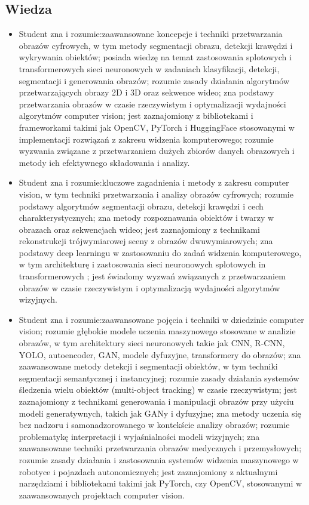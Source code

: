 \documentclass[12pt, a4paper]{article}
\begin{document}
\subsection*{Wiedza}
\begin{itemize}
  \item Student zna i rozumie:zaawansowane koncepcje i techniki przetwarzania obrazów cyfrowych, w tym metody segmentacji obrazu, detekcji krawędzi i wykrywania obiektów; posiada wiedzę na temat zastosowania splotowych i transformerowych sieci neuronowych w zadaniach klasyfikacji, detekcji, segmentacji i generowania obrazów; rozumie zasady działania algorytmów przetwarzających obrazy 2D i 3D oraz sekwence wideo; zna podstawy przetwarzania obrazów w czasie rzeczywistym i optymalizacji wydajności algorytmów computer vision; jest zaznajomiony z bibliotekami i frameworkami takimi jak OpenCV, PyTorch i HuggingFace stosowanymi w implementacji rozwiązań z zakresu widzenia komputerowego; rozumie wyzwania związane z przetwarzaniem dużych zbiorów danych obrazowych i metody ich efektywnego składowania i analizy.
  \item Student zna i rozumie:kluczowe zagadnienia i metody z zakresu computer vision, w tym techniki przetwarzania i analizy obrazów cyfrowych; rozumie podstawy algorytmów segmentacji obrazu, detekcji krawędzi i cech charakterystycznych; zna metody rozpoznawania obiektów i twarzy w obrazach oraz sekwencjach wideo; jest zaznajomiony z technikami rekonstrukcji trójwymiarowej sceny z obrazów dwuwymiarowych; zna podstawy deep learningu w zastosowaniu do zadań widzenia komputerowego, w tym architekturę i zastosowania sieci neuronowych splotowych in transformerowych ; jest świadomy wyzwań związanych z przetwarzaniem obrazów w czasie rzeczywistym i optymalizacją wydajności algorytmów wizyjnych.
  \item Student zna i rozumie:zaawansowane pojęcia i techniki w dziedzinie computer vision; rozumie głębokie modele uczenia maszynowego stosowane w analizie obrazów, w tym architektury sieci neuronowych takie jak CNN, R-CNN, YOLO, autoencoder, GAN, modele dyfuzyjne, transformery do obrazów; zna zaawansowane metody detekcji i segmentacji obiektów, w tym techniki segmentacji semantycznej i instancyjnej; rozumie zasady działania systemów śledzenia wielu obiektów (multi-object tracking) w czasie rzeczywistym; jest zaznajomiony z technikami generowania i manipulacji obrazów przy użyciu modeli generatywnych, takich jak GANy i dyfuzyjne; zna metody uczenia się bez nadzoru i samonadzorowanego w kontekście analizy obrazów; rozumie problematykę interpretacji i wyjaśnialności modeli wizyjnych; zna zaawansowane techniki przetwarzania obrazów medycznych i przemysłowych; rozumie zasady działania i zastosowania systemów widzenia maszynowego w robotyce i pojazdach autonomicznych; jest zaznajomiony z aktualnymi narzędziami i bibliotekami takimi jak PyTorch, czy OpenCV, stosowanymi w zaawansowanych projektach computer vision.
\end{itemize}
\end{document}
